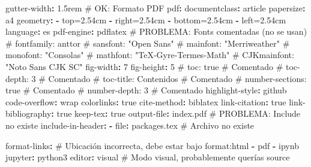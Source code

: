 \documentclass[
  doc,
  floatsintext,
  longtable,
  a4paper,
  nolmodern,
  notxfonts,
  notimes,
  12pt,
  colorlinks=true,linkcolor=blue,citecolor=blue,urlcolor=blue]{apa7}
\newenvironment{Shaded}{\begin{snugshade}}{\end{snugshade}}
\newcommand{\AttributeTok}[1]{\textcolor[rgb]{0.40,0.45,0.13}{#1}}
\newcommand{\CharTok}[1]{\textcolor[rgb]{0.13,0.47,0.30}{#1}}
\newcommand{\CommentTok}[1]{\textcolor[rgb]{0.37,0.37,0.37}{#1}}
\newcommand{\DecValTok}[1]{\textcolor[rgb]{0.68,0.00,0.00}{#1}}
\newcommand{\FunctionTok}[1]{\textcolor[rgb]{0.28,0.35,0.67}{#1}}
\newcommand{\KeywordTok}[1]{\textcolor[rgb]{0.00,0.23,0.31}{\textbf{#1}}}
\begin{document}
\begin{Shaded}
\begin{Highlighting}[]
\AttributeTok{      }\FunctionTok{gutter{-}width}\KeywordTok{:}\AttributeTok{ 1.5rem}
\AttributeTok{      }
\CommentTok{  \# OK: Formato PDF}
\AttributeTok{  }\FunctionTok{pdf}\KeywordTok{:}
\AttributeTok{    }\FunctionTok{documentclass}\KeywordTok{:}\AttributeTok{ article  }
\AttributeTok{    }\FunctionTok{papersize}\KeywordTok{:}\AttributeTok{ a4  }
\AttributeTok{    }\FunctionTok{geometry}\KeywordTok{:}\AttributeTok{ }
\AttributeTok{      }\KeywordTok{{-}}\AttributeTok{ top=2.54cm  }
\AttributeTok{      }\KeywordTok{{-}}\AttributeTok{ right=2.54cm  }
\AttributeTok{      }\KeywordTok{{-}}\AttributeTok{ bottom=2.54cm  }
\AttributeTok{      }\KeywordTok{{-}}\AttributeTok{ left=2.54cm  }
\AttributeTok{    }\FunctionTok{language}\KeywordTok{:}\AttributeTok{ es  }
\AttributeTok{    }\FunctionTok{pdf{-}engine}\KeywordTok{:}\AttributeTok{ pdflatex    }
\CommentTok{    \#  PROBLEMA: Fonts comentadas (no se usan)}
\CommentTok{    \# fontfamily: anttor}
\CommentTok{    \# sansfont: "Open Sans" }
\CommentTok{    \# mainfont: "Merriweather"}
\CommentTok{    \# monofont: "Consolas"}
\CommentTok{    \# mathfont: "TeX{-}Gyre{-}Termes{-}Math"}
\CommentTok{    \# CJKmainfont: "Noto Sans CJK SC"}
\AttributeTok{    }\FunctionTok{fig{-}width}\KeywordTok{:}\AttributeTok{ }\DecValTok{7}
\AttributeTok{    }\FunctionTok{fig{-}height}\KeywordTok{:}\AttributeTok{ }\DecValTok{5}
\CommentTok{    \# toc: true  \#  Comentado}
\CommentTok{    \# toc{-}depth: 3  \#  Comentado}
\CommentTok{    \# toc{-}title: Contenidos  \#  Comentado}
\CommentTok{    \# number{-}sections: true  \#  Comentado}
\CommentTok{    \# number{-}depth: 3  \#  Comentado}
\AttributeTok{    }\FunctionTok{highlight{-}style}\KeywordTok{:}\AttributeTok{ github  }
\AttributeTok{    }\FunctionTok{code{-}overflow}\KeywordTok{:}\AttributeTok{ wrap  }
\AttributeTok{    }\FunctionTok{colorlinks}\KeywordTok{:}\AttributeTok{ }\CharTok{true}\AttributeTok{  }
\AttributeTok{    }\FunctionTok{cite{-}method}\KeywordTok{:}\AttributeTok{ biblatex  }
\AttributeTok{    }\FunctionTok{link{-}citation}\KeywordTok{:}\AttributeTok{ }\CharTok{true}\AttributeTok{  }
\AttributeTok{    }\FunctionTok{link{-}bibliography}\KeywordTok{:}\AttributeTok{ }\CharTok{true}\AttributeTok{  }
\AttributeTok{    }\FunctionTok{keep{-}tex}\KeywordTok{:}\AttributeTok{ }\CharTok{true}\AttributeTok{  }
\AttributeTok{    }\FunctionTok{output{-}file}\KeywordTok{:}\AttributeTok{ index.pdf}
\CommentTok{    \#  PROBLEMA: Include no existe}
\AttributeTok{    }\FunctionTok{include{-}in{-}header}\KeywordTok{:}\AttributeTok{ }
\AttributeTok{      }\KeywordTok{{-}}\AttributeTok{ }\FunctionTok{file}\KeywordTok{:}\AttributeTok{ packages.tex}\CommentTok{  \#  Archivo no existe}

\FunctionTok{format{-}links}\KeywordTok{:}\CommentTok{   \#  Ubicación incorrecta, debe estar bajo format:html}
\AttributeTok{  }\KeywordTok{{-}}\AttributeTok{ pdf}
\AttributeTok{  }\KeywordTok{{-}}\AttributeTok{ ipynb}
\AttributeTok{  }
\FunctionTok{jupyter}\KeywordTok{:}\AttributeTok{ python3}
\FunctionTok{editor}\KeywordTok{:}\AttributeTok{ visual}\CommentTok{    \#  Modo visual, probablemente querías source}
\end{Highlighting}
\end{Shaded}
\end{document}
